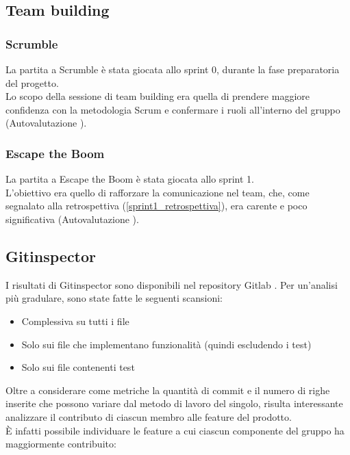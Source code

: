 \documentclass[11pt]{article}
\newcommand{\fref}[1]{\hyperref[#1]{\cref{#1}}}
\begin{document}
\subsection{Team building}
\subsubsection{Scrumble}
La partita a Scrumble è stata giocata allo sprint 0, durante la fase preparatoria del progetto.\\
Lo scopo della sessione di team building era quella di prendere maggiore confidenza con la metodologia Scrum e 
confermare i ruoli all'interno del gruppo (Autovalutazione \cite{gqm_scrumble}).

\subsubsection{Escape the Boom}
La partita a Escape the Boom è stata giocata allo sprint 1.\\
L'obiettivo era quello di rafforzare la comunicazione nel team, che, come segnalato alla retrospettiva (\fref{sprint1_retrospettiva}),
era carente e poco significativa (Autovalutazione \cite{gqm_escapetheboom}).


\subsection{Gitinspector}
I risultati di Gitinspector sono disponibili nel repository Gitlab \cite{gitinspector}. 
Per un'analisi più gradulare, sono state fatte le seguenti scansioni:
\begin{itemize}
    \item Complessiva su tutti i file
    \item Solo sui file che implementano funzionalità (quindi escludendo i test)
    \item Solo sui file contenenti test
\end{itemize}

Oltre a considerare come metriche la quantità di commit e il numero di righe inserite che possono variare dal metodo di lavoro del singolo,
risulta interessante analizzare il contributo di ciascun membro alle feature del prodotto.\\
È infatti possibile individuare le feature a cui ciascun componente del gruppo ha maggiormente contribuito:

\end{document}
